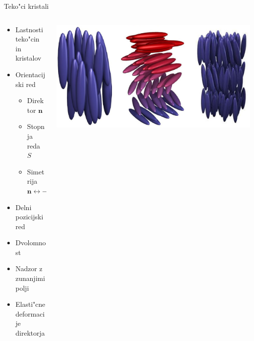 \documentclass{beamer}
\renewcommand{\vec}{\mathbf}
\begin{document}
\begin{frame}{Teko"ci kristali}
 \begin{columns}[c]
  \begin{column}{.5\textwidth}
  
   \begin{itemize}
    \item Lastnosti teko"cin in kristalov
    \item Orientacijski red
      \begin{itemize}
	\item Direktor $\vec n$
	\item Stopnja reda $S$
	\item Simetrija $\vec n \leftrightarrow -\vec n$
      \end{itemize}
    \item Delni pozicijski red
    \item Dvolomnost
    \item Nadzor z zunanjimi polji
    \item Elasti"cne deformacije direktorja
   \end{itemize}
  \end{column}

  \begin{column}{.5\textwidth}
    \includegraphics[width=\textwidth]{./Slike/faze_brez_crk} \\


\end{column}
\end{columns}
\end{frame}
\end{document}
